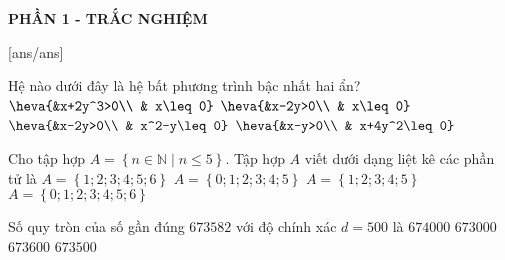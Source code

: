 
\begin{center}
	\textbf{PHẦN 1 - TRẮC NGHIỆM}
\end{center}
[ans/ans]
\begin{ex}%
	Hệ nào dưới đây là hệ bất phương trình bậc nhất hai ẩn?
	\choice
	{$\heva{&x+2y^3>0\\ & x\leq 0}$}
	{\True $\heva{&x-2y>0\\ & x\leq 0}$}
	{$\heva{&x-2y>0\\ & x^2-y\leq 0}$}
	{$\heva{&x-y>0\\ & x+4y^2\leq 0}$}
\end{ex}
\begin{ex}%
	Cho tập hợp $A=\left\{n \in \mathbb{N} \mid n \leq 5\right\}$. Tập hợp \(A\) viết dưới dạng liệt kê các phần tử là
	\choice
	{$A=\left\{1 ; 2 ; 3 ; 4 ; 5 ; 6\right\}$}
	{\True $A=\left\{0 ; 1 ; 2 ; 3 ; 4 ; 5\right\}$}
	{ $A=\left\{1 ; 2 ; 3 ; 4 ; 5\right\}$}
	{$A=\left\{0 ; 1 ; 2 ; 3 ; 4 ; 5 ; 6\right\}$}
\end{ex}

\begin{ex}%
	Số quy tròn của số gần đúng $673582$ với độ chính xác $d=500$ là
	\choice
	{\True $674000$}
	{$673000$}
	{$673600$}
	{$673500 $}
\end{ex}


